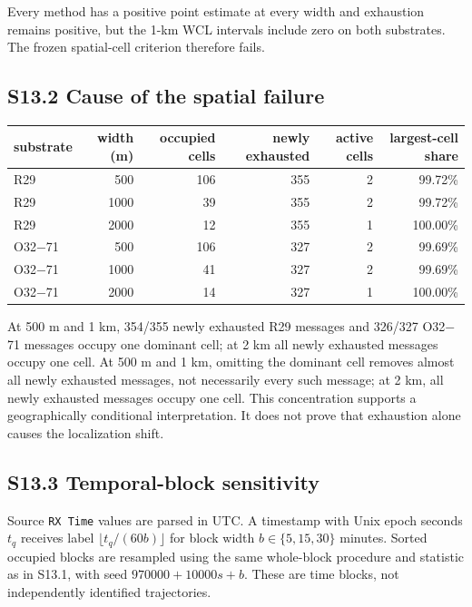 \documentclass[journal,onecolumn,10pt]{IEEEtran}
\begin{document}
Every method has a positive point estimate at every width and exhaustion remains positive, but the 1-km WCL intervals include zero on both substrates. The frozen spatial-cell criterion therefore fails.

\subsection*{S13.2 Cause of the spatial failure}

\begin{center}\begin{minipage}{\textwidth}\centering
{}

\begin{tabular}{@{}lrrrrr@{}}
\toprule
substrate & width (m) & occupied cells & newly exhausted & active cells & largest-cell share \\
\midrule

R29 & 500 & 106 & 355 & 2 & 99.72\% \\
R29 & 1000 & 39 & 355 & 2 & 99.72\% \\
R29 & 2000 & 12 & 355 & 1 & 100.00\% \\
O32$-$71 & 500 & 106 & 327 & 2 & 99.69\% \\
O32$-$71 & 1000 & 41 & 327 & 2 & 99.69\% \\
O32$-$71 & 2000 & 14 & 327 & 1 & 100.00\% \\
\bottomrule
\end{tabular}
\end{minipage}\end{center}

At 500 m and 1 km, 354/355 newly exhausted R29 messages and 326/327 O32$-$71 messages occupy one dominant cell; at 2 km all newly exhausted messages occupy one cell. At 500 m and 1 km, omitting the dominant cell removes almost all newly exhausted messages, not necessarily every such message; at 2 km, all newly exhausted messages occupy one cell. This concentration supports a geographically conditional interpretation. It does not prove that exhaustion alone causes the localization shift.

\subsection*{S13.3 Temporal-block sensitivity}

Source \texttt{RX Time} values are parsed in UTC. A timestamp with Unix epoch seconds $t_q$ receives label $\lfloor t_q/(60b)\rfloor$ for block width $b\in\{5,15,30\}$ minutes. Sorted occupied blocks are resampled using the same whole-block procedure and statistic as in S13.1, with seed $970000+10000s+b$. These are time blocks, not independently identified trajectories.
\end{document}
